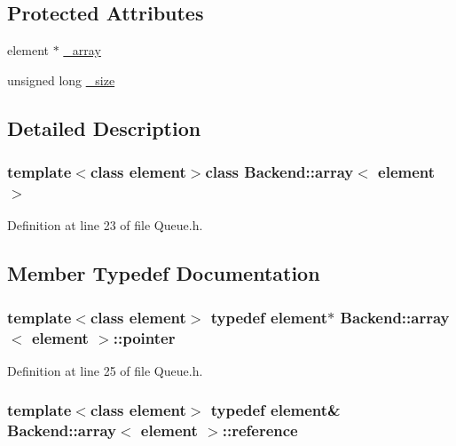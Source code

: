 \subsection*{Protected Attributes}
\begin{DoxyCompactItemize}
\item 
element $\ast$ \hyperlink{class_backend_1_1array_ac588c1e30c2c4748bc9a5bb12b9320af}{\+\_\+array}
\item 
unsigned long \hyperlink{class_backend_1_1array_ae51d64e87b42931946111c28b98e8a18}{\+\_\+size}
\end{DoxyCompactItemize}


\subsection{Detailed Description}
\subsubsection*{template$<$class element$>$class Backend\+::array$<$ element $>$}



Definition at line 23 of file Queue.\+h.



\subsection{Member Typedef Documentation}
\hypertarget{class_backend_1_1array_a6d8785dc8b979153ef122f4e3bad1408}{
\subsubsection[{pointer}]{\setlength{\rightskip}{0pt plus 5cm}template$<$class element$>$ typedef element$\ast$ {\bf Backend\+::array}$<$ element $>$\+::{\bf pointer}}}\label{class_backend_1_1array_a6d8785dc8b979153ef122f4e3bad1408}


Definition at line 25 of file Queue.\+h.

\hypertarget{class_backend_1_1array_aa98075b8d7a4e63ea919ee9d1d4df4a9}{
\subsubsection[{reference}]{\setlength{\rightskip}{0pt plus 5cm}template$<$class element$>$ typedef element\& {\bf Backend\+::array}$<$ element $>$\+::{\bf reference}}}\label{class_backend_1_1array_aa98075b8d7a4e63ea919ee9d1d4df4a9}


